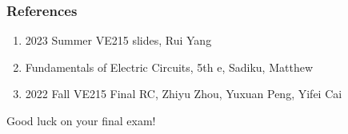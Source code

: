 \documentclass{beamer}
\begin{document}
\begin{frame}
\frametitle{References}
\begin{enumerate}
\item 2023 Summer VE215 slides, Rui Yang
\item Fundamentals of Electric Circuits, 5th e, Sadiku, Matthew
\item 2022 Fall VE215 Final RC, Zhiyu Zhou, Yuxuan Peng, Yifei Cai
\end{enumerate}
\end{frame}


\begin{frame}
\huge{\centerline{Good luck on your final exam!}}
\end{frame}
\end{document}
